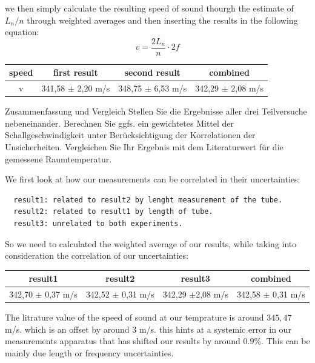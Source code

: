 we then simply calculate the resulting speed of sound thourgh the estimate of $L_n / n$ through weighted averages and then inserting the results in the following equation:
$$
v  =  \frac{2 L_{n}}{n} \cdot 2f
$$


\begin{table}[H]
  \begin{tabular}{cccc}
    \hline speed & first result& second result& combined\\ \hline
    v & 341,58 $\pm$ 2,20 m/s& 348,75 $\pm$ 6,53 m/s & 342,29 $\pm$ 2,08 m/s\\ \hline 
  \end{tabular}
\end{table}





\begin{aufgabe}{Zusammenfassung und Vergleich}
  Stellen Sie die Ergebnisse aller drei Teilversuche
  nebeneinander. Berechnen Sie ggfs. ein gewichtetes Mittel der
  Schallgeschwindigkeit unter Berücksichtigung der Korrelationen der
  Unsicherheiten. Vergleichen Sie Ihr Ergebnis mit dem Literaturwert
  für die gemessene Raumtemperatur.
\end{aufgabe}

We first look at how our measurements can be correlated in their uncertainties:

\begin{verbatim}
  result1: related to result2 by lenght measurement of the tube.
  result2: related to result1 by length of tube.
  result3: unrelated to both experiments.
\end{verbatim}

So we need to calculated the weighted average of our results, while taking into consideration the correlation of our uncertainties:

\begin{table}[H]
  \begin{tabular}{cccc}
    result1 & result2 & result3 & combined\\ \hline
     342,70 $\pm$ 0,37 m/s& 342,52 $\pm$ 0,31 m/s & 342,29 $\pm$2,08 m/s & 342,58 $\pm$ 0,31 m/s\\
  \end{tabular}
\end{table}


The litrature value of the speed of sound at our temprature is around $345,47$ m/s. which is an offset by around $3$ m/s. this hints at a systemic error in our measurements apparatus that has shifted our results by around $0.9 \%$. This can be mainly due length or frequency uncertainties. 